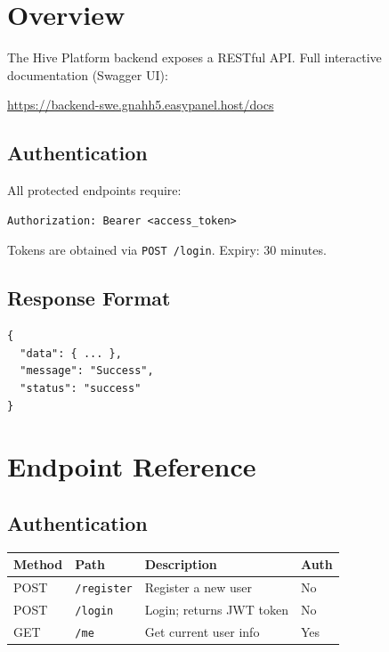 \documentclass[10pt,a4paper]{report}
\begin{document}
\section{Overview}

The Hive Platform backend exposes a RESTful API. Full interactive documentation (Swagger UI):
\begin{center}
    \url{https://backend-swe.gnahh5.easypanel.host/docs}
\end{center}

\subsection{Authentication}

All protected endpoints require:
\begin{lstlisting}
Authorization: Bearer <access_token>
\end{lstlisting}
Tokens are obtained via \texttt{POST /login}. Expiry: 30 minutes.

\subsection{Response Format}

\begin{lstlisting}
{
  "data": { ... },
  "message": "Success",
  "status": "success"
}
\end{lstlisting}

\section{Endpoint Reference}

\subsection{Authentication}

\begin{longtable}{|l|p{4.5cm}|p{5cm}|l|}
    \hline
    \textbf{Method} & \textbf{Path}              & \textbf{Description}            & \textbf{Auth} \\
    \hline
    \endhead
    POST            & \texttt{/register}         & Register a new user             & No            \\
    \hline
    POST            & \texttt{/login}            & Login; returns JWT token        & No            \\
    \hline
    GET             & \texttt{/me}               & Get current user info           & Yes           \\
    \hline
\end{longtable}
\end{document}
